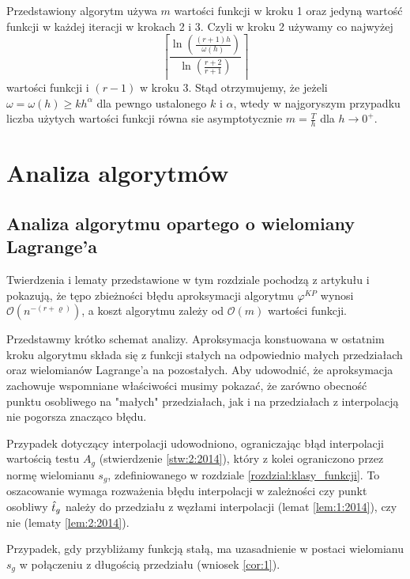 \documentclass[oik, pdftex, man]{mgrwms}
\begin{document}
    Przedstawiony algorytm używa $m$ wartości funkcji w kroku 1 oraz jedyną wartość funkcji w każdej iteracji w krokach 2 i 3. Czyli w kroku 2 używamy co najwyżej
    \begin{equation*}
        \left\lceil\frac{\ln \left(\frac{(r+1) h}{\omega(h)}\right)}{\ln \left(\frac{r+2}{r+1}\right)}\right\rceil
    \end{equation*}
    wartości funkcji i $(r-1)$ w kroku 3.
    Stąd otrzymujemy, że jeżeli $\omega = \omega(h) \geq kh^{\alpha}$ dla pewngo ustalonego $k$ i $\alpha$, wtedy w najgoryszym przypadku liczba użytych wartości funkcji równa sie asymptotycznie $m = \frac{T}{h}$ dla $h \rightarrow 0^{+}$.


\mgrclosechapter


\chapter{Analiza algorytmów} \label{rozdzial:analiza_alg}


\section{Analiza algorytmu opartego o wielomiany Lagrange'a}

    Twierdzenia i lematy przedstawione w tym rozdziale pochodzą z artykułu \cite{CoDF} i pokazują, że tępo zbieżności błędu aproksymacji algorytmu $\varphi^{KP}$ wynosi $\mathcal{O}(n^{-(r+\varrho)})$, a koszt algorytmu zależy od $\mathcal{O}(m)$ wartości funkcji.

    Przedstawmy krótko schemat analizy. Aproksymacja konstuowana w ostatnim kroku algorytmu składa się z funkcji stałych na odpowiednio małych przedziałach oraz wielomianów Lagrange'a na pozostałych. Aby udowodnić, że aproksymacja zachowuje wspomniane właściwości musimy pokazać, że zarówno obecność punktu osobliwego na "małych" przedziałach, jak i na przedziałach z interpolacją nie pogorsza znacząco błędu.

    Przypadek dotyczący interpolacji udowodniono, ograniczając błąd interpolacji wartością testu $A_{g}$ (stwierdzenie \ref{stw:2:2014}), który z kolei ograniczono przez normę wielomianu $s_{g}$, zdefiniowanego w rozdziale \ref{rozdzial:klasy_funkcji}. To oszacowanie wymaga rozważenia błędu interpolacji w zależności czy punkt osobliwy $\hat{t}_{g}$ należy do przedziału z węzłami interpolacji (lemat \ref{lem:1:2014}), czy nie (lematy \ref{lem:2:2014}).
    
    Przypadek, gdy przybliżamy funkcją stałą, ma uzasadnienie w postaci wielomianu $s_{g}$ w połączeniu z długością przedziału (wniosek \ref{cor:1}).
\end{document}
